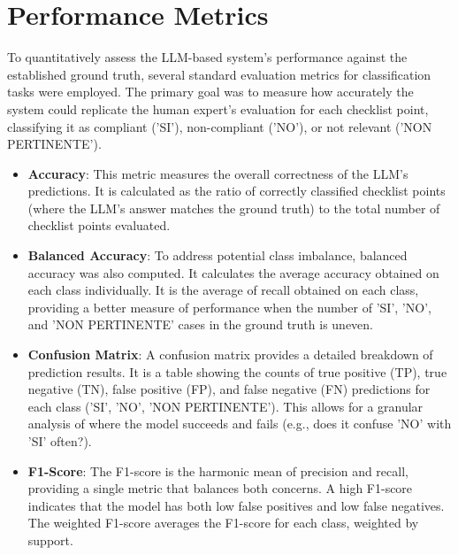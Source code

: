 \documentclass[../main.tex]{subfiles}
\begin{document}
\section{Performance Metrics}
\label{sec:performance_metrics_eval}

To quantitatively assess the LLM-based system's performance against the established ground truth, several standard evaluation metrics for classification tasks were employed. The primary goal was to measure how accurately the system could replicate the human expert's evaluation for each checklist point, classifying it as compliant ('SI'), non-compliant ('NO'), or not relevant ('NON PERTINENTE').



\begin{itemize}
    
    \item \textbf{Accuracy}: This metric measures the overall correctness of the LLM's predictions. It is calculated as the ratio of correctly classified checklist points (where the LLM's answer matches the ground truth) to the total number of checklist points evaluated.
    
    \item \textbf{Balanced Accuracy}: To address potential class imbalance, balanced accuracy was also computed. It calculates the average accuracy obtained on each class individually. It is the average of recall obtained on each class, providing a better measure of performance when the number of 'SI', 'NO', and 'NON PERTINENTE' cases in the ground truth is uneven.

    \item \textbf{Confusion Matrix}: A confusion matrix provides a detailed breakdown of prediction results. It is a table showing the counts of true positive (TP), true negative (TN), false positive (FP), and false negative (FN) predictions for each class ('SI', 'NO', 'NON PERTINENTE'). This allows for a granular analysis of where the model succeeds and fails (e.g., does it confuse 'NO' with 'SI' often?).

    \item \textbf{F1-Score}: The F1-score is the harmonic mean of precision and recall, providing a single metric that balances both concerns. A high F1-score indicates that the model has both low false positives and low false negatives. The weighted F1-score averages the F1-score for each class, weighted by support.
    

\end{itemize}
\end{document}
